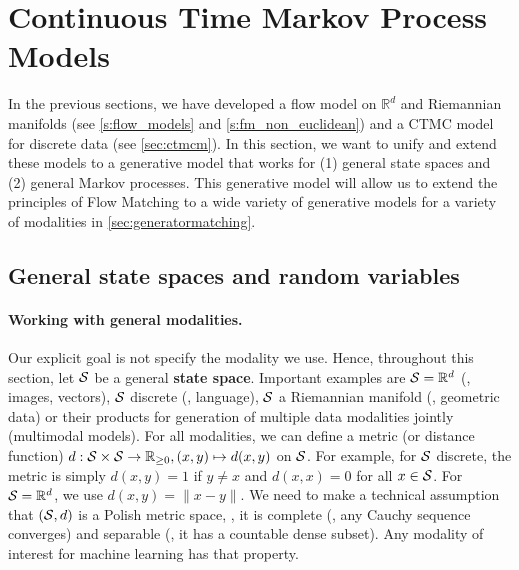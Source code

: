 \documentclass{fairmeta}
\newcommand{\highlight}[1]{{\color{metablue} \textbf{#1}}}
\numberwithin{equation}{section}
\begin{document}
\pagebreak
\section{Continuous Time Markov Process Models}\label{sec:fellerflow}
In the previous sections, we have developed a flow model on $\mathbb{R}^d$ and Riemannian manifolds (see \cref{s:flow_models} and \cref{s:fm_non_euclidean}) and a CTMC model for discrete data (see \cref{sec:ctmcm}). In this section, we want to unify and extend these models to a generative model that works for (1) general state spaces and (2) general Markov processes. This generative model will allow us to extend the principles of Flow Matching to a wide variety of generative models for a variety of modalities in \cref{sec:generatormatching}.



\subsection{General state spaces and random variables}

\paragraph{Working with general modalities.} Our explicit goal is not specify the modality we use. Hence, throughout this section, let ${\mathcal{S}}$ be a general \highlight{state space}. Important examples  are ${\mathcal{S}}=\mathbb{R}^d$ (\eg, images, vectors), ${\mathcal{S}}$ discrete (\eg,  language), ${\mathcal{S}}$ a Riemannian manifold (\eg, geometric data) or their products for generation of multiple data modalities jointly (multimodal models). For all modalities, we can define a metric (or distance function) $d:{\mathcal{S}}\times{\mathcal{S}}\to\mathbb{R}_{\geq 0},(x,y)\mapsto d(x,y)$ on ${\mathcal{S}}$. For example, for ${\mathcal{S}}$ discrete, the metric is simply $d(x,y)=1$ if $y\neq x$ and $d(x,x)=0$ for all $x\in{\mathcal{S}}$. For ${\mathcal{S}}=\mathbb{R}^d$, we use $d(x,y)=\|x-y\|$. We need to make a technical assumption that $({\mathcal{S}},d)$ is a Polish metric space, \ie, it is complete (\ie, any Cauchy sequence converges) and separable (\ie, it has a countable dense subset). Any modality of interest for machine learning has that property.
\end{document}
